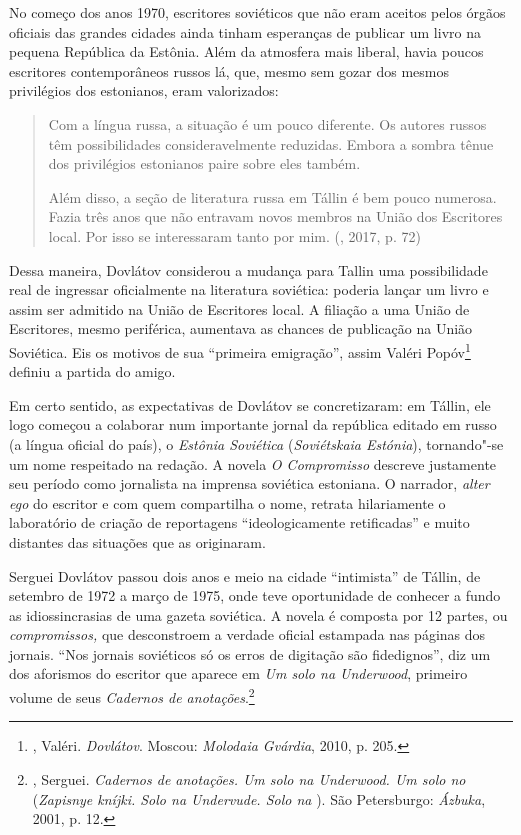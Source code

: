 No começo dos anos 1970, escritores soviéticos que não eram aceitos
pelos órgãos oficiais das grandes cidades ainda tinham esperanças de
publicar um livro na pequena República da Estônia. Além da atmosfera
mais liberal, havia poucos escritores contemporâneos russos lá, que,
mesmo sem gozar dos mesmos privilégios dos estonianos, eram valorizados:

\begin{quotation}
Com a língua russa, a situação é um pouco diferente. Os au­tores russos
têm possibilidades consideravelmente reduzidas. Embora a sombra tênue
dos privilégios estonianos paire sobre eles também.

Além disso, a seção de literatura russa em Tállin é bem pou­co numerosa.
Fazia três anos que não entravam novos mem­bros na União dos Escritores
local. Por isso se interessaram tanto por mim.
{}(, 2017, p. 72)
\end{quotation}

Dessa maneira, Dovlátov considerou a mudança para Tallin uma
possibilidade real de ingressar oficialmente na literatura soviética:
poderia lançar um livro e assim ser admitido na União de Escritores
local. A filiação a uma União de Escritores, mesmo periférica, aumentava
as chances de publicação na União Soviética. Eis os motivos de sua
``primeira emigração'', assim Valéri Popóv\footnote{, Valéri.
  \emph{Dovlátov}. Moscou: \emph{Molodaia Gvárdia}, 2010, p. 205.}
definiu a partida do amigo.

Em certo sentido, as expectativas de Dovlátov se concretizaram: em
Tállin, ele logo começou a colaborar num importante jornal da república
editado em russo (a língua oficial do país), o \emph{Estônia Soviética}
(\emph{Soviétskaia Estónia}), tornando"-se um nome respeitado na redação.
A novela \emph{O Compromisso} descreve justamente seu período como
jornalista na imprensa soviética estoniana. O narrador, \emph{alter ego}
do escritor e com quem compartilha o nome, retrata hilariamente o
laboratório de criação de reportagens ``ideologicamente retificadas'' e
muito distantes das situações que as originaram.

\begin{center}
{}
\end{center}

Serguei Dovlátov passou dois anos e meio na cidade ``intimista'' de
Tállin, de setembro de 1972 a março de 1975, onde teve oportunidade de
conhecer a fundo as idiossincrasias de uma gazeta soviética. A novela é
composta por 12 partes, ou \emph{compromissos,} que desconstroem a
verdade oficial estampada nas páginas dos jornais. ``Nos jornais
soviéticos só os erros de digitação são fidedignos'', diz um dos
aforismos do escritor que aparece em \emph{Um solo na Underwood},
primeiro volume de seus \emph{Cadernos de anotações}.\footnote{,
  Serguei. \emph{Cadernos de anotações. Um solo na Underwood. Um solo no
  } (\emph{Zapisnye kníjki. Solo na Undervude. Solo na }). São
  Petersburgo: \emph{Ázbuka}, 2001, p. 12.}

